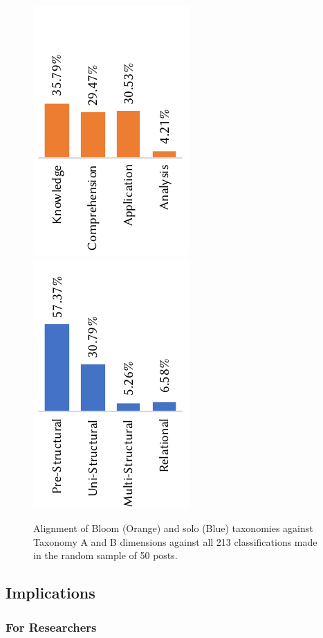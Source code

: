 \begin{figure}[t]
  \centering
  \includegraphics[width=.29\linewidth]{bloom}\includegraphics[width=.29\linewidth]{solo}
  \caption[Alignment of Bloom and SOLO taxonomies against computer vision issues]{
    Alignment of Bloom (Orange) and \gls{solo} (Blue) taxonomies against Taxonomy A and B dimensions against all 213 classifications made in the random sample of 50 posts.
  }
  \label{icse2020:fig:alignment-of-blooms-solo}
\end{figure}

\subsection{Implications}
\label{icse2020:ssec:findings:documentation-vs-education}

\subsubsection{For Researchers}

